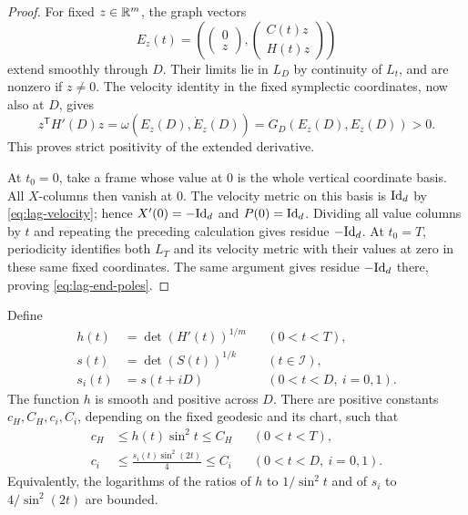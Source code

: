 \begin{proof}
For fixed $z\in\mathbb R^m$, the graph vectors
\[
 E_z(t)=\left(\begin{pmatrix}0\\z\end{pmatrix},
                 \begin{pmatrix}C(t)z\\H(t)z\end{pmatrix}\right)
\]
extend smoothly through $D$.  Their limits lie in $L_D$ by continuity
of $L_t$, and are nonzero if $z\ne0$.  The velocity identity in the
fixed symplectic coordinates, now also at $D$, gives
\[
 z^{\mathsf T}H'(D)z
 =\omega(E_z(D),\dot E_z(D))
 =G_D(E_z(D),E_z(D))>0.
\]
This proves strict positivity of the extended derivative.

At $t_0=0$, take a frame whose value at $0$ is the whole vertical
coordinate basis.  All $X$-columns then vanish at $0$.  The velocity
metric on this basis is $\mathrm{Id}_d$ by \eqref{eq:lag-velocity}; hence
$X'(0)=-\mathrm{Id}_d$ and $P(0)=\mathrm{Id}_d$.  Dividing all value columns by $t$
and repeating the preceding calculation gives residue $-\mathrm{Id}_d$.
At $t_0=T$, periodicity identifies both $L_T$ and its velocity metric
with their values at zero in these same fixed coordinates.  The same
argument gives residue $-\mathrm{Id}_d$ there, proving
\eqref{eq:lag-end-poles}.
\end{proof}

\begin{proposition}
\label{lag:profiles}
Define
\begin{equation}
 \begin{aligned}
 h(t)&=\det(H'(t))^{1/m} &&(0<t<T),\\
 s(t)&=\det(S(t))^{1/k} &&(t\in\mathcal I),\\
 s_i(t)&=s(t+iD) &&(0<t<D,\ i=0,1).
 \end{aligned}
 \label{eq:lag-profiles}
\end{equation}
The function $h$ is smooth and positive across $D$.  There are positive
constants $c_H,C_H,c_i,C_i$, depending on the fixed geodesic and its
chart, such that
\begin{align}
 c_H&\le h(t)\sin^2t\le C_H &&(0<t<T),
 \label{eq:lag-h-bounds}\\
 c_i&\le \frac{s_i(t)\sin^2(2t)}4\le C_i
 &&(0<t<D,\ i=0,1).
 \label{eq:lag-s-bounds}
\end{align}
Equivalently, the logarithms of the ratios of $h$ to $1/\sin^2t$ and
of $s_i$ to $4/\sin^2(2t)$ are bounded.
\end{proposition}

